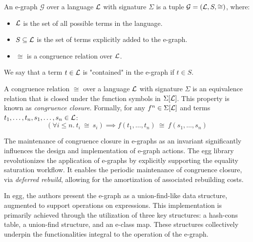 \begin{definition}[E-graph]
An e-graph $\mathcal{G}$ over a language $\mathcal{L}$ with signature $\Sigma$ is a tuple $\mathcal{G} = (\mathcal{L}, S, \cong)$, where:
\begin{itemize}
    \item $\mathcal{L}$ is the set of all possible terms in the language.
    \item $S \subseteq \mathcal{L}$ is the set of terms explicitly added to the e-graph.
    \item $\cong$ is a congruence relation over $\mathcal{L}$.
\end{itemize}
We say that a term $t \in \mathcal{L}$ is "contained" in the e-graph if $t \in S$.
\end{definition}

\begin{definition}
\label{perlims:congrel}
A congruence relation $\cong$ over a language $\mathcal{L}$ with signature $\Sigma$ is an equivalence relation that is closed under the function symbols in $\Sigma[\mathcal{L}]$.
This property is known as \emph{congruence closure}. 
Formally, for any $f^n \in \Sigma[\mathcal{L}]$ and terms $t_1, \ldots, t_n, s_1, \ldots, s_n \in \mathcal{L}$:
\[
(\forall i \leq n.~t_i~\cong~s_i) \implies f(t_1, \ldots, t_n)~\cong~f(s_1, \ldots, s_n)
\]
\end{definition}

The maintenance of congruence closure in e-graphs as an invariant significantly influences the design and implementation of e-graph actions.
The egg library~\cite{egg} revolutionizes the application of e-graphs by explicitly supporting the equality saturation workflow.
It enables the periodic maintenance of congruence closure, via \emph{deferred rebuild}, allowing for the amortization of associated rebuilding costs.

In egg, the authors present the e-graph as a union-find-like data structure, augmented to support operations on expressions.
This implementation is primarily achieved through the utilization of three key structures: a hash-cons table, a union-find structure, and an e-class map.
These structures collectively underpin the functionalities integral to the operation of the e-graph.


